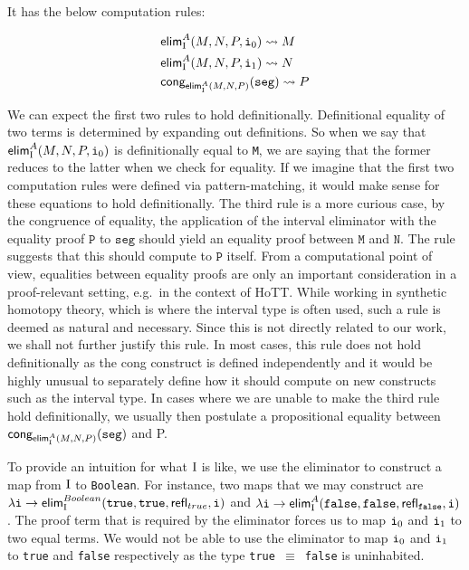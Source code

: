 \documentclass[12pt,twoside,maitrise]{dms}
\theoremstyle{definition}
\numberwithin{equation}{section}
\numberwithin{table}{chapter}
\numberwithin{figure}{chapter}
\newcommand\kw[1] {\textsf{#1}}
\newcommand\id[1] {\texttt{#1}}
\newcommand\fn[1] {\texttt{#1}}
\begin{document}
\begin{prooftree*}
   \infer3{\oftype{\ctx, \oftype{i}{\bI}}{\kw{elim}_{\bI}^{A} (M, N, P, i)}{A}}
\end{prooftree*}

It has the below computation rules:

\begin{align*}
  & \kw{elim}_{\bI}^{A}(M, N, P, \ileft) \rightsquigarrow{} M \\
  & \kw{elim}_{\bI}^{A}(M, N, P, \iright) \rightsquigarrow{} N \\
  & \kw{cong}_{\kw{elim}_{\bI}^{A}(M, N, P)}(\id{seg}) \rightsquigarrow{} P
\end{align*}

We can expect the first two rules to hold definitionally. Definitional equality
of two terms is determined by expanding out definitions. So when we say that
$\kw{elim}_{\bI}^{A}(M, N , P, \ileft)$ is definitionally equal to \id{M}, we
are saying that the former reduces to the latter when we check for equality. If
we imagine that the first two computation rules were defined via
pattern-matching, it would make sense for these equations to hold
definitionally. The third rule is a more curious case, by the congruence of
equality, the application of the interval eliminator with the equality proof
$\id{P}$ to $\id{seg}$ should yield an equality proof between $\id{M}$ and
$\id{N}$. The rule suggests that this should compute to $\id{P}$ itself. From a
computational point of view, equalities between equality proofs are only an
important consideration in a proof-relevant setting, e.g.\ in the context of
HoTT\@. While working in synthetic homotopy theory, which is where the interval
type is often used, such a rule is deemed as natural and necessary. Since this
is not directly related to our work, we shall not further justify this rule. In
most cases, this rule does not hold definitionally as the \kw{cong} construct is
defined independently and it would be highly unusual to separately define how it
should compute on new constructs such as the interval type. In cases where we
are unable to make the third rule hold definitionally, we usually then postulate
a propositional equality between $\kw{cong}_{\kw{elim}_{\bI}^{A}(M, N,
  P)}(\id{seg})$ and P.

To provide an intuition for what $\mathrm{I}$ is like, we use the eliminator to
construct a map from $\mathrm{I}$ to \id{Boolean}. For instance, two maps that we may
construct are $\lambda \id{i} \rightarrow \kw{elim}_{\bI}^{Boolean}(\id{true},
\id{true}, \kw{refl}_{true}, \id{i})$ and $\lambda \id{i} \rightarrow
\kw{elim}_{\bI}^{A}(\id{false}, \id{false}, \kw{refl}_{\id{false}}, \id{i})$.
The proof term that is required by the eliminator forces us to map $\ileft$ and
$\iright$ to two equal terms. We would not be able to use the
eliminator to map $\ileft$ and $\iright$ to \id{true} and \id{false}
respectively as the type \fn{true $\equiv$ false} is uninhabited.
\end{document}

